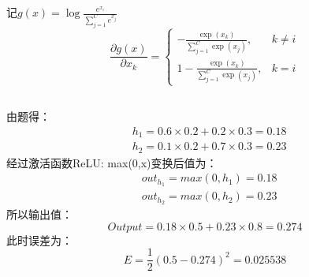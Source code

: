 \documentclass[UTF8,a4paper,AutoFakeBold,AutoFakeSlant]{article}
\begin{document}
记$ g(x) = \log \frac{e^{x_i}}{\sum_{j=1}^C e^{x_j}} $
\begin{equation*}
  \frac{\partial g(x)}{\partial x_{k}}=\left\{\begin{array}{ll}
    -\frac{\exp \left(x_{k}\right)}{\sum_{j=1}^{C} \exp \left(x_{j}\right)},  & k \neq i \\
    1-\frac{\exp \left(x_{k}\right)}{\sum_{j=1}^{C} \exp \left(x_{j}\right)}, & k=i
  \end{array}\right.
\end{equation*}



\subsection{}

由题得：
\begin{equation*}
  \begin{aligned}
     & h_1 = 0.6\times 0.2 + 0.2\times 0.3 = 0.18 \\
     & h_2 = 0.1\times 0.2 + 0.7\times 0.3 = 0.23
  \end{aligned}
\end{equation*}
经过激活函数ReLU: max(0,x)变换后值为：
\begin{equation*}
  \begin{aligned}
     & out_{h_1} = max(0,h_1) = 0.18 \\
     & out_{h_2} = max(0,h_2) = 0.23
  \end{aligned}
\end{equation*}
所以输出值：
\begin{equation*}
  Output = 0.18\times 0.5 + 0.23\times 0.8 = 0.274
\end{equation*}
此时误差为：
\begin{equation*}
  E = \frac{1}{2} (0.5-0.274)^2 = 0.025538
\end{equation*}
\end{document}
